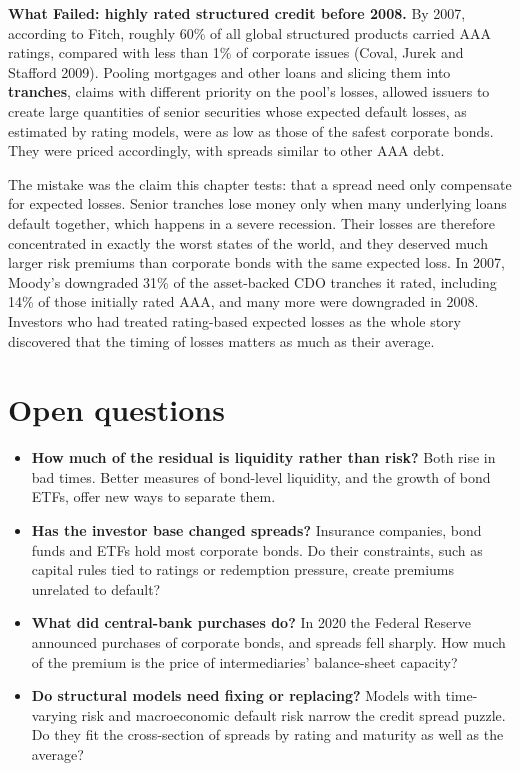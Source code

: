 \begin{callout}
\textbf{What Failed: highly rated structured credit before 2008.} By 2007, according to Fitch, roughly 60\% of all global structured products carried AAA ratings, compared with less than 1\% of corporate issues (Coval, Jurek and Stafford 2009). Pooling mortgages and other loans and slicing them into \textbf{tranches}, claims with different priority on the pool's losses, allowed issuers to create large quantities of senior securities whose expected default losses, as estimated by rating models, were as low as those of the safest corporate bonds. They were priced accordingly, with spreads similar to other AAA debt.

The mistake was the claim this chapter tests: that a spread need only compensate for expected losses. Senior tranches lose money only when many underlying loans default together, which happens in a severe recession. Their losses are therefore concentrated in exactly the worst states of the world, and they deserved much larger risk premiums than corporate bonds with the same expected loss. In 2007, Moody's downgraded 31\% of the asset-backed CDO tranches it rated, including 14\% of those initially rated AAA, and many more were downgraded in 2008. Investors who had treated rating-based expected losses as the whole story discovered that the timing of losses matters as much as their average.
\end{callout}

\section{Open questions}
\label{sec:18-open}

\begin{itemize}
  \item \textbf{How much of the residual is liquidity rather than risk?} Both rise in bad times. Better measures of bond-level liquidity, and the growth of bond ETFs, offer new ways to separate them.
  \item \textbf{Has the investor base changed spreads?} Insurance companies, bond funds and ETFs hold most corporate bonds. Do their constraints, such as capital rules tied to ratings or redemption pressure, create premiums unrelated to default?
  \item \textbf{What did central-bank purchases do?} In 2020 the Federal Reserve announced purchases of corporate bonds, and spreads fell sharply. How much of the premium is the price of intermediaries' balance-sheet capacity?
  \item \textbf{Do structural models need fixing or replacing?} Models with time-varying risk and macroeconomic default risk narrow the credit spread puzzle. Do they fit the cross-section of spreads by rating and maturity as well as the average?
\end{itemize}


